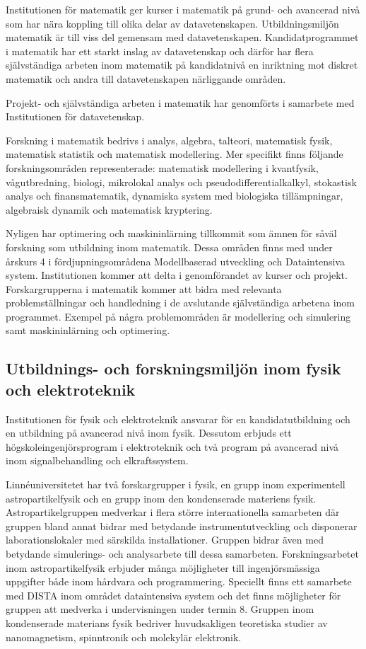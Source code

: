 Institutionen för matematik ger kurser i matematik på grund- och avancerad nivå som har nära koppling till olika delar av datavetenskapen. Utbildningsmiljön matematik är till viss del gemensam med datavetenskapen. Kandidatprogrammet i matematik har ett starkt inslag av datavetenskap och därför har flera självständiga arbeten inom matematik på kandidatnivå en inriktning mot diskret matematik och andra till datavetenskapen närliggande områden.

Projekt- och självständiga arbeten i matematik har genomförts i samarbete med Institutionen för datavetenskap.

Forskning i matematik bedrivs i analys, algebra, talteori, matematisk fysik, matematisk statistik och matematisk modellering. Mer specifikt finns följande forskningsområden representerade: matematisk modellering i kvantfysik, vågutbredning, biologi, mikrolokal analys och pseudodifferentialkalkyl, stokastisk analys och finansmatematik, dynamiska system med biologiska tillämpningar, algebraisk dynamik och matematisk kryptering.

Nyligen har optimering och maskininlärning tillkommit som ämnen för såväl forskning som utbildning inom matematik. Dessa områden finns med under årskurs 4 i fördjupningsområdena Modellbaserad utveckling och Dataintensiva system. Institutionen kommer att delta i genomförandet av kurser och projekt. Forskargrupperna i matematik kommer att bidra med relevanta problemställningar och handledning i de avslutande självständiga arbetena inom programmet. Exempel på några problemområden är modellering och simulering samt maskininlärning och optimering.


\subsection{Utbildnings- och forskningsmiljön inom fysik och elektroteknik}

Institutionen för fysik och elektroteknik ansvarar för en kandidatutbildning och en utbildning på avancerad nivå inom fysik. Dessutom erbjuds ett högskoleingenjörsprogram i elektroteknik och två program på avancerad nivå inom signalbehandling och elkraftssystem.

Linnéuniversitetet har två forskargrupper i fysik, en grupp inom experimentell astropartikelfysik och en grupp inom den kondenserade materiens fysik. Astropartikelgruppen medverkar i flera större internationella samarbeten där gruppen bland annat bidrar med betydande instrumentutveckling och disponerar laborationslokaler med särskilda installationer. Gruppen bidrar även med betydande simulerings- och analysarbete till dessa samarbeten. Forskningsarbetet inom astropartikelfysik erbjuder många möjligheter till ingenjörsmässiga uppgifter både inom hårdvara och programmering. Speciellt finns ett samarbete med DISTA inom området dataintensiva system och det finns möjligheter för gruppen att medverka i undervisningen under termin 8. Gruppen inom kondenserade materians fysik bedriver huvudsakligen teoretiska studier av nanomagnetism, spinntronik och molekylär elektronik.

